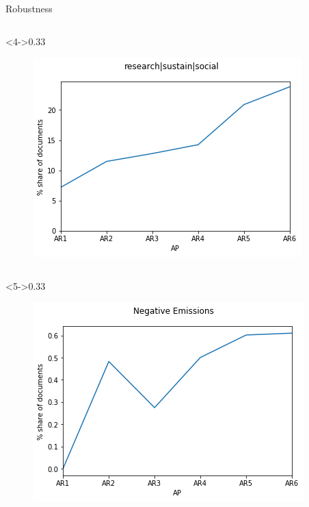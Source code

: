 \documentclass[9pt]{beamer}
\begin{document}
\begin{frame}{Robustness}
\begin{columns}
	\begin{column}<4->{0.33\linewidth}
		\begin{figure}
			\includegraphics[width=\linewidth]{../plots/sus_share}
		\end{figure}
	\end{column}
	
\end{columns}
\begin{columns}
	
	\begin{column}<5->{0.33\linewidth}
		\begin{figure}
			\includegraphics[width=\linewidth]{../plots/negative_emissions_share}
		\end{figure}
	\end{column}
	

\end{columns}
\end{frame}
\end{document}
